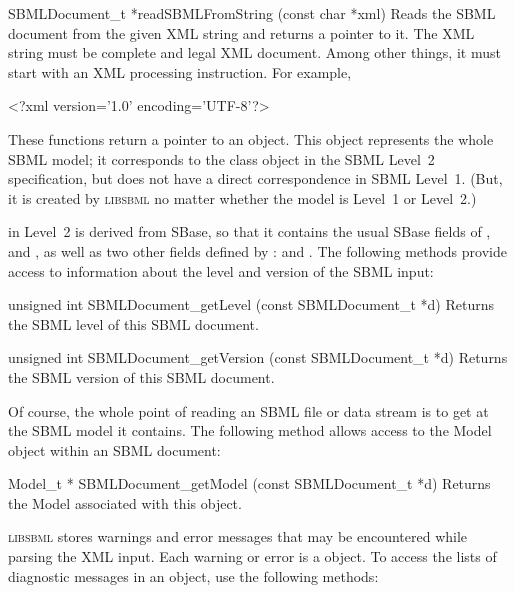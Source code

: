 \documentclass{sbmlmanual}
\newcommand{\libsbml}{\textsc{libsbml}}
\begin{document}
\begin{methoddef}{SBMLDocument\_t *readSBMLFromString (const char *xml)}
  Reads the SBML document from the given XML string and returns a pointer
  to it.
  The XML string must be complete and legal XML document.  Among other
  things, it must start with an XML processing instruction.  For example,
  \begin{example}
    <?xml version='1.0' encoding='UTF-8'?>
  \end{example}
\end{methoddef}


These functions return a pointer to an  object.
This object represents the whole SBML model; it corresponds to the
 class object in the SBML Level~2 specification, but does not
have a direct correspondence in SBML Level~1.  (But, it is created by
\libsbml{} no matter whether the model is Level~1 or Level~2.)

 in Level~2 is derived from SBase, so that it
contains the usual SBase fields of ,  and
, as well as two other fields defined by :
 and .  The following methods provide access
to information about the level and version of the SBML input:


\begin{methoddef}{unsigned int SBMLDocument\_getLevel (const SBMLDocument\_t *d)}
  Returns the SBML level of this SBML document.
\end{methoddef}


\begin{methoddef}{unsigned int SBMLDocument\_getVersion (const SBMLDocument\_t *d)}
  Returns the SBML version of this SBML document.
\end{methoddef}


Of course, the whole point of reading an SBML file or data stream is to get
at the SBML model it contains.  The following method allows access to the
Model object within an SBML document:


\begin{methoddef}{Model\_t * SBMLDocument\_getModel (const SBMLDocument\_t *d)}
  Returns the Model associated with this  object.
\end{methoddef}


\libsbml{} stores warnings and error messages that may be encountered while
parsing the XML input.  Each warning or error is a 
object.  To access the lists of diagnostic messages in an
 object, use the following methods:
\end{document}
